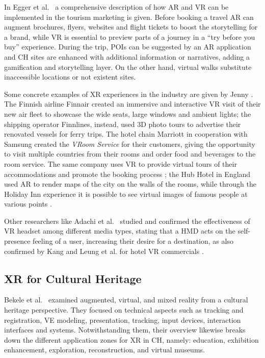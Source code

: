 In Egger et al.~\cite{egger_augmented_2020} a comprehensive description of how AR and VR can be implemented in the tourism marketing is given. Before booking a travel AR can augment brochures, flyers, websites and flight tickets to boost the storytelling for a brand, while VR is essential to preview parts of a journey in a “try before you buy” experience. During the trip, POIs can be suggested by an AR application and CH sites are enhanced with additional information or narratives, adding a gamification and storytelling layer. On the other hand, virtual walks substitute inaccessible locations or not existent sites.

Some concrete examples of XR experiences in the industry are given by Jenny \cite{jenny_enhancing_2017}. The Finnish airline Finnair created an immersive and interactive VR visit of their new air fleet to showcase the wide seats, large windows and ambient lights; the shipping operator Finnlines, instead, used 3D photo tours to advertise their renovated vessels for ferry trips. The hotel chain Marriott in cooperation with Samsung created the \textit{VRoom Service} for their customers, giving the opportunity to visit multiple countries from their rooms and order food and beverages to the room service. The same company uses VR to provide virtual tours of their accommodations and promote the booking process \cite{adachi_using_2020}; the Hub Hotel in England used AR to render maps of the city on the walls of the rooms, while through the Holiday Inn experience it is possible to see virtual images of famous people at various points \cite{ercan_examination_2020}.

Other researchers like Adachi et al.~\cite{adachi_using_2020} studied and confirmed the effectiveness of VR headset among different media types, stating that a HMD acts on the self-presence feeling of a user, increasing their desire for a destination, as also confirmed by Kang \cite{kang_impact_2020} and Leung et al. for hotel VR commercials \cite{leung_fad_2020}.

\subsection{XR for Cultural Heritage}
Bekele et al.~\cite{bekele_survey_2018} examined augmented, virtual, and mixed reality from a cultural heritage perspective. They focused on technical aspects such as tracking and registration, VE modeling, presentation, tracking, input devices, interaction interfaces and systems. Notwithstanding them, their overview likewise breaks down the different application zones for XR in CH, namely: education, exhibition enhancement, exploration, reconstruction, and virtual museums.

